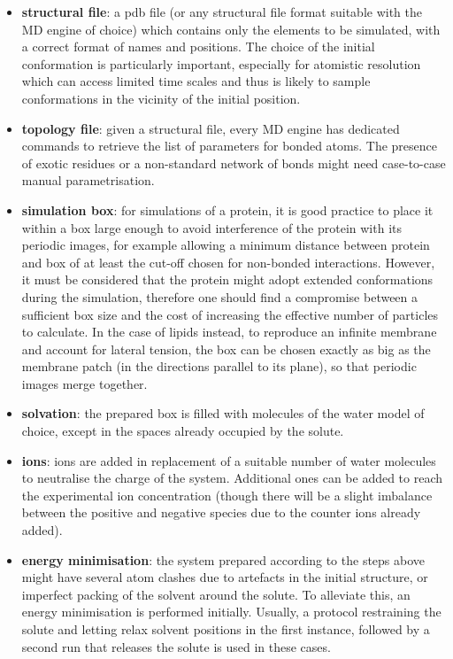 \documentclass[graybox]{svmult}
\begin{document}
\begin{itemize}
\item \textbf{structural file}: a pdb file (or any structural file format suitable with the MD engine of choice) which contains only the elements to be simulated, with a correct format of names and positions. The choice of the initial conformation is particularly important, especially for atomistic resolution which can access limited time scales and thus is likely to sample conformations in the vicinity of the initial position.
\item \textbf{topology file}: given a structural file, every MD engine has dedicated commands to retrieve the list of parameters for bonded atoms. The presence of exotic residues or a non-standard network of bonds might need case-to-case manual parametrisation.
\item \textbf{simulation box}: for simulations of a protein, it is good practice to place it within a box large enough to avoid interference of the protein with its periodic images, for example allowing a minimum distance between protein and box of at least the cut-off chosen for non-bonded interactions. However, it must be considered that the protein might adopt extended conformations during the simulation, therefore one should find a compromise between a sufficient box size and the cost of increasing the effective number of particles to calculate.
%
In the case of lipids instead, to reproduce an infinite membrane and account for lateral tension, the box can be chosen exactly as big as the membrane patch (in the directions parallel to its plane), so that periodic images merge together.
\item \textbf{solvation}: the prepared box is filled with molecules of the water model of choice, except in the spaces already occupied by the solute.
\item \textbf{ions}: ions are added in replacement of a suitable number of water molecules to neutralise the charge of the system. Additional ones can be added to reach the experimental ion concentration (though there will be a slight imbalance between the positive and negative species due to the counter ions already added).
%
\item \textbf{energy minimisation}: the system prepared according to the steps above might have several atom clashes due to artefacts in the initial structure, or imperfect packing of the solvent around the solute. To alleviate this, an energy minimisation is performed initially. Usually, a protocol restraining the solute and letting relax solvent positions in the first instance, followed by a second run that releases the solute is used in these cases.

\end{itemize}
\end{document}
